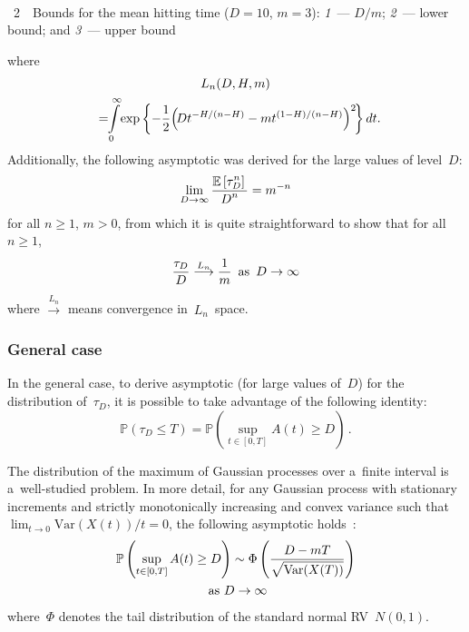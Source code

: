 \begin{multicols}{2}
{ \begin{center}  %
   \mbox{%
 \epsfxsize=79mm 
 }


\end{center}


\noindent
{{\figurename~2}\ \ \small{Bounds for the mean hitting time ($D=10$, $m=3$): 
\textit{1}~--- $D/m$;
\textit{2}~--- lower bound;
and \textit{3}~--- upper bound}}
}


\addtocounter{figure}{1}


\noindent
where
\begin{multline*}
L_n(D,H,m) \\
{}=\!\! \int\limits_0^\infty \!\exp\left\{ -\fr{1}{2} \!
\left(\!Dt^{-H/(n-H)}-mt^{(1-H)/(n-H)} \right)^2 \!\right\}dt.\hspace*{-3.80858pt}
\end{multline*}
Additionally, the following asymptotic was derived for the large values of level~$D$:
\begin{equation*}
    \lim\limits_{D \to \infty} \displaystyle\frac{\displaystyle \mathbb{E} \left[\tau_D^n\right]\mathstrut}{\displaystyle D^n\mathstrut} = m^{-n}
\end{equation*}
for all $n \ge 1$, $m>0$, from which it is quite straightforward to show that 
for all $n \ge 1$, 
\begin{equation*}
     \displaystyle\frac{\displaystyle \tau_D\mathstrut}{\displaystyle D\mathstrut} \overset{L_n}{\longrightarrow} \displaystyle\frac{\displaystyle 1\mathstrut}{\displaystyle m\mathstrut}\enskip 
     \mbox{as} \enskip D \to \infty
\end{equation*}
where $\overset{L_n}{\longrightarrow}$ means convergence in~$L_n$~space.

\subsubsection{General case}

\noindent
In the general case,  to derive asymptotic (for large values of~$D$) 
for the distribution of~$\tau_D$,  it is possible to take advantage of the 
following identity: 
\begin{equation*}
\mathbb{P}\left(\tau_D \le  T\right) = 
\mathbb{P}\left(\sup\limits_{t \in [0,T]}A(t)\ge D\right)\,.
\end{equation*}

The distribution of the maximum of Gaussian processes over a~finite interval is 
a~well-studied  problem. In more detail, for any Gaussian process with stationary 
increments and strictly monotonically increasing and
convex variance such that $\lim\nolimits_{t\to 0} \mathrm{Var}(X(t))/t=0$, the following asymptotic 
holds~\cite{18-luk-1}:
\begin{multline*}
\mathbb{P}\left(\sup\limits_{t \in [0,T]}A(t)\ge D\right) \sim 
\Phi \left( \displaystyle\frac{\displaystyle D-mT\mathstrut}{\displaystyle \sqrt{\mathrm{Var}(X(T))}\mathstrut} \right)\\
 \mbox{ as } D \to \infty
\end{multline*}
where~$\Phi$ denotes the tail distribution of the standard normal RV~$N(0,1)$.


\end{multicols}
